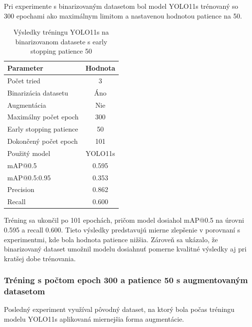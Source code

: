                 Pri experimente s binarizovaným datasetom bol model YOLO11s trénovaný so 300 epochami ako maximálnym limitom a nastavenou hodnotou patience na 50. 

                \begin{table}[H]
                    \centering
                    \begin{tabular}{|l|c|}
                    \hline
                    \textbf{Parameter} & \textbf{Hodnota} \\ \hline
                    Počet tried & 3 \\ \hline
                    Binarizácia datasetu & Áno \\ \hline
                    Augmentácia & Nie \\ \hline
                    Maximálny počet epoch & 300 \\ \hline
                    Early stopping patience & 50 \\ \hline
                    Dokončený počet epoch & 101 \\ \hline
                    Použitý model & YOLO11s \\ \hline
                    mAP@0.5 & 0.595 \\ \hline
                    mAP@0.5:0.95 & 0.353 \\ \hline
                    Precision & 0.862 \\ \hline
                    Recall & 0.600 \\ \hline
                    \end{tabular}
                    \caption{Výsledky tréningu YOLO11s na binarizovanom datasete s early stopping patience 50}
                    \label{tab:yolo11s_binary_earlystop_p50}
                \end{table}

                Tréning sa ukončil po 101 epochách, pričom model dosiahol mAP@0.5 na úrovni 0.595 a recall 0.600. Tieto výsledky predstavujú mierne zlepšenie v porovnaní s experimentmi, kde bola hodnota patience nižšia. Zároveň sa ukázalo, že binarizovaný dataset umožnil modelu dosiahnuť pomerne kvalitné výsledky aj pri kratšej dobe trénovania.

                \subsubsection{Tréning s počtom epoch 300 a patience 50 s augmentovaným datasetom}

                Posledný experiment využíval pôvodný dataset, na ktorý bola počas tréningu modelu YOLO11s aplikovaná miernejšia forma augmentácie.

